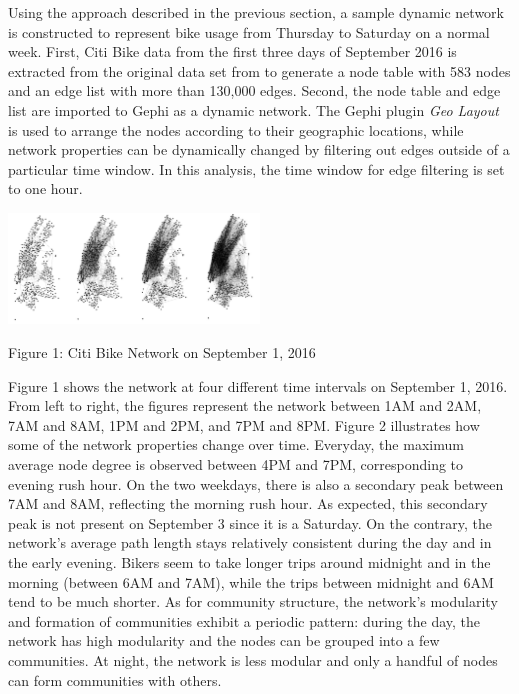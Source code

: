 \documentclass[times, 10pt,twocolumn]{article}
\begin{document}
Using the approach described in the previous section, a sample dynamic network is constructed to represent bike usage from Thursday to Saturday on a normal week. First, Citi Bike data from the first three days of September 2016 is extracted from the original data set from \cite{dataset} to generate a node table with 583 nodes and an edge list with more than 130,000 edges. Second, the node table and edge list are imported to Gephi as a dynamic network. The Gephi plugin \textit{Geo Layout} is used to arrange the nodes according to their geographic locations, while network properties can be dynamically changed by filtering out edges outside of a particular time window. In this analysis, the time window for edge filtering is set to one hour.\\

\centerline{\includegraphics[width=0.5\textwidth]{combined.jpg}}
\centerline{Figure 1: Citi Bike Network on September 1, 2016}

Figure 1 shows the network at four different time intervals on September 1, 2016. From left to right, the figures represent the network between 1AM and 2AM, 7AM and 8AM, 1PM and 2PM, and 7PM and 8PM. Figure 2 illustrates how some of the network properties change over time. Everyday, the maximum average node degree is observed between 4PM and 7PM, corresponding to evening rush hour. On the two weekdays, there is also a secondary peak between 7AM and 8AM, reflecting the morning rush hour. As expected, this secondary peak is not present on September 3 since it is a Saturday. On the contrary, the network's average path length stays relatively consistent during the day and in the early evening. Bikers seem to take longer trips around midnight and in the morning (between 6AM and 7AM), while the trips between midnight and 6AM tend to be much shorter. As for community structure, the network's modularity and formation of communities exhibit a periodic pattern: during the day, the network has high modularity and the nodes can be grouped into a few communities. At night, the network is less modular and only a handful of nodes can form communities with others.
\end{document}
